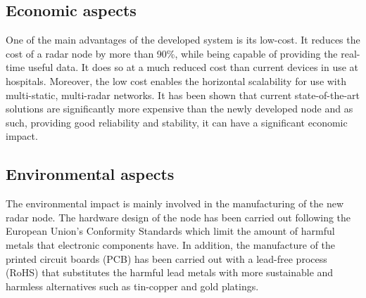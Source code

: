 \subsection{Economic aspects}

One of the main advantages of the developed system is its low-cost. It reduces the cost of a radar node by more than 90\%, while being capable of providing the real-time useful data. It does so at a much reduced cost than current devices in use at hospitals. Moreover, the low cost enables the horizontal scalability for use with multi-static, multi-radar networks. It has been shown that current state-of-the-art solutions are significantly more expensive than the newly developed node and as such, providing good reliability and stability, it can have a significant economic impact.

\subsection{Environmental aspects}

The environmental impact is mainly involved in the manufacturing of the new radar node. The hardware design of the node has been carried out following the European Union's Conformity Standards \cite{EUConform2022} which limit the amount of harmful metals that electronic components have. In addition, the manufacture of the printed circuit boards (PCB) has been carried out with a lead-free process (RoHS) that substitutes the harmful lead metals with more sustainable and harmless alternatives such as tin-copper and gold platings. 

